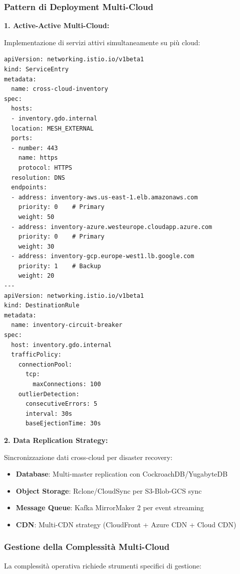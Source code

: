 \subsubsection{Pattern di Deployment Multi-Cloud}

\textbf{1. Active-Active Multi-Cloud:}

Implementazione di servizi attivi simultaneamente su più cloud:

\begin{lstlisting}[caption={Kubernetes Multi-Cloud Service},label={lst:multicloud_k8s}]
apiVersion: networking.istio.io/v1beta1
kind: ServiceEntry
metadata:
  name: cross-cloud-inventory
spec:
  hosts:
  - inventory.gdo.internal
  location: MESH_EXTERNAL
  ports:
  - number: 443
    name: https
    protocol: HTTPS
  resolution: DNS
  endpoints:
  - address: inventory-aws.us-east-1.elb.amazonaws.com
    priority: 0    # Primary
    weight: 50
  - address: inventory-azure.westeurope.cloudapp.azure.com
    priority: 0    # Primary
    weight: 30
  - address: inventory-gcp.europe-west1.lb.google.com
    priority: 1    # Backup
    weight: 20
---
apiVersion: networking.istio.io/v1beta1
kind: DestinationRule
metadata:
  name: inventory-circuit-breaker
spec:
  host: inventory.gdo.internal
  trafficPolicy:
    connectionPool:
      tcp:
        maxConnections: 100
    outlierDetection:
      consecutiveErrors: 5
      interval: 30s
      baseEjectionTime: 30s
\end{lstlisting}

\textbf{2. Data Replication Strategy:}

Sincronizzazione dati cross-cloud per disaster recovery:

\begin{itemize}
    \item \textbf{Database}: Multi-master replication con CockroachDB/YugabyteDB
    \item \textbf{Object Storage}: Rclone/CloudSync per S3-Blob-GCS sync
    \item \textbf{Message Queue}: Kafka MirrorMaker 2 per event streaming
    \item \textbf{CDN}: Multi-CDN strategy (CloudFront + Azure CDN + Cloud CDN)
\end{itemize}

\subsubsection{Gestione della Complessità Multi-Cloud}

La complessità operativa richiede strumenti specifici di gestione:

